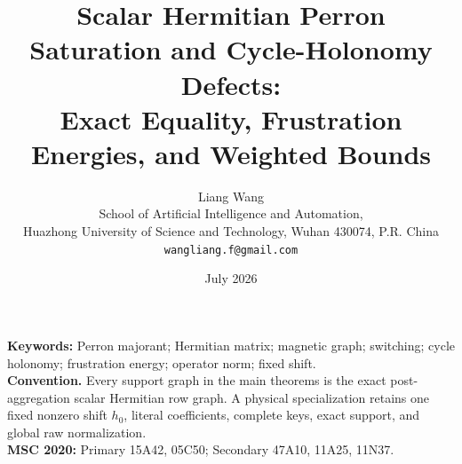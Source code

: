 \documentclass[11pt]{article}
\title{Scalar Hermitian Perron Saturation and Cycle-Holonomy Defects:\\
Exact Equality, Frustration Energies, and Weighted Bounds}
\author{Liang Wang\\
School of Artificial Intelligence and Automation,\\
Huazhong University of Science and Technology, Wuhan 430074, P.R. China\\
\texttt{wangliang.f@gmail.com}}
\date{July 2026}
\theoremstyle{remark}
\begin{document}
\maketitle


\noindent\textbf{Keywords:} Perron majorant; Hermitian matrix; magnetic
graph; switching; cycle holonomy; frustration energy; operator norm;
fixed shift.\\[0.5em]
\noindent\textbf{Convention.} Every support graph in the main theorems
is the exact post-aggregation scalar Hermitian row graph.  A physical
specialization retains one fixed nonzero shift \(h_0\), literal
coefficients, complete keys, exact support, and global raw
normalization.\\[0.5em]
\noindent\textbf{MSC 2020:} Primary 15A42, 05C50; Secondary 47A10,
11A25, 11N37.














\begingroup
\small
\raggedright


\endgroup
\end{document}
